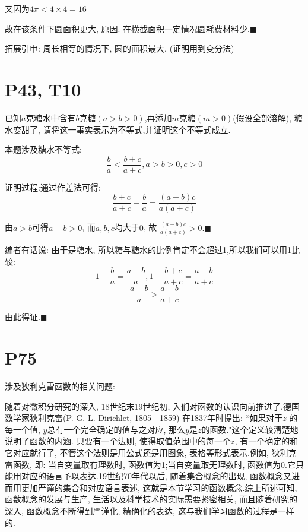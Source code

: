 \documentclass{book}
\begin{document}
又因为$\displaystyle 4\pi < 4 \times 4 = 16$

故在该条件下圆面积更大, 原因: 在横截面积一定情况圆耗费材料少.$\blacksquare$

\textcolor[rgb]{0.38,0.11,0.2}{拓展引申: 周长相等的情况下, 圆的面积最大. (证明用到变分法)}
\section{\textcolor[rgb]{0.11,0.65,0.52}{P43, T10}}
\begin{boxB}
    已知$a$克糖水中含有$b$克糖$(a>b>0)$,再添加$m$克糖$(m>0)$(假设全部溶解), 糖水变甜了, 请将这一事实表示为不等式,并证明这个不等式成立.
\end{boxB}

本题涉及\textcolor[rgb]{0.38,0.11,0.2}{糖水不等式}:
$$
    \frac{b}{a} < \frac{b+c}{a+c}, a>b>0, c>0
$$

证明过程:通过\textcolor[rgb]{0.75,0.17,0.22}{作差法}可得:
$$
    \frac{b+c}{a+c} - \frac{b}{a} = \frac{(a-b)c}{a(a+c)}
$$

由$a>b$可得$a-b>0$, 而$a,b,c$均大于$0$, 故 $\displaystyle \frac{(a-b)c}{a(a+c)}>0. \blacksquare$

编者有话说: 由于是糖水, 所以糖与糖水的比例肯定不会超过1,所以我们可以用1比较:
$$
    1-\frac{b}{a}=\frac{a-b}{a},1-\frac{b+c}{a+c}=\frac{a-b}{a+c}
$$
$$
    \frac{a-b}{a}>\frac{a-b}{a+c}
$$

由此得证.$\blacksquare$

\section{\textcolor[rgb]{0.11,0.65,0.52}{P75}}
涉及\textcolor[rgb]{0.38,0.11,0.2}{狄利克雷函数}的相关问题:

随着对微积分研究的深入, 18世纪末19世纪初, 入们对函数的认识向前推进了.德国数学家狄利克雷(P. G. L. Dirichlet, 1805—1859) 在1837年时提出: ``如果对于$z$ 的每一个值, $y$总有一个完全确定的值与之对应, 那么$y$是$z$的函数."这个定义较清楚地说明了函数的内涵. 只要有一个法则, 使得取值范围中的每一个$z$, 有一个确定的和它对应就行了, 不管这个法则是用公式还是用图象, 表格等形式表示.例如, 狄利克雷函数, 即: 当自变量取有理数时, 函数值为1;当自变量取无理数时, 函数值为0.它只能用对应的语言予以表达.19世纪70年代以后, 随着集合概念的出现, 函数概念又进而用更加严谨的集合和对应语言表述, 这就是本节学习的函数概念.综上所述可知, 函数概念的发展与生产, 生活以及科学技术的实际需要紧密相关, 而且随着研究的深入, 函数概念不断得到严谨化, 精确化的表达, 这与我们学习函数的过程是一样的.
\end{document}
